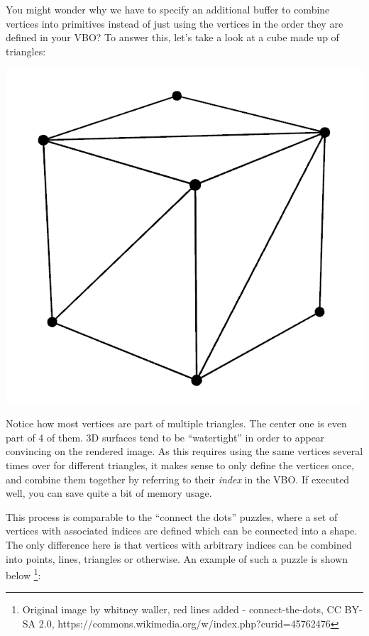 You might wonder why we have to specify an additional buffer to combine vertices into primitives instead of just using the vertices in the order they are defined in your VBO? To answer this, let's take a look at a cube made up of triangles:\\

\centerline{\includegraphics[scale=0.3]{images/cube.png}}

Notice how most vertices are part of multiple triangles. The center one is even part of 4 of them. 3D surfaces tend to be ``watertight'' in order to appear convincing on the rendered image. As this requires using the same vertices several times over for different triangles, it makes sense to only define the vertices once, and combine them together by referring to their \emph{index} in the VBO. If executed well, you can save quite a bit of memory usage. 

This process is comparable to the ``connect the dots'' puzzles, where a set of vertices with associated indices are defined which can be connected into a shape. The only difference here is that vertices with arbitrary indices can be combined into points, lines, triangles or otherwise. An example of such a puzzle is shown below \footnote{Original image by whitney waller, red lines added - connect-the-dots, CC BY-SA 2.0, https://commons.wikimedia.org/w/index.php?curid=45762476}:

